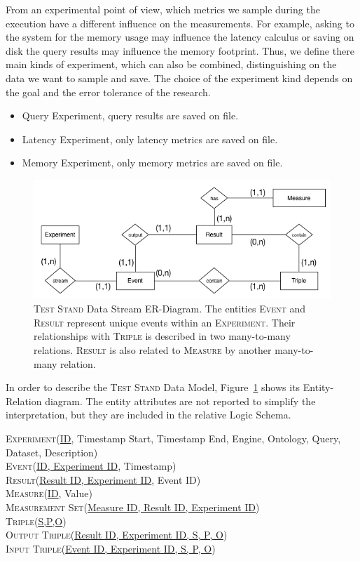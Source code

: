 From an experimental point of view, which metrics we sample during the execution have a different influence on the measurements. For example, asking to the system for the memory usage may influence the latency calculus or saving on disk the query results may influence the memory footprint. Thus, we define there main kinds of experiment, which can also be combined, distinguishing on the data we want to sample and save. The choice of the experiment kind depends on the goal and the error tolerance of the research.
\begin{itemize}
\item Query Experiment, query results are saved on file.
\item Latency Experiment, only latency metrics are saved on file.
\item Memory Experiment, only memory metrics are saved on file.
\end{itemize}

\begin{figure}[h!]
  \centering
	\includegraphics[width=\linewidth]{images/er-db}
	\caption[\textsc{Test Stand} Data Stream ER-Diagram]{\textsc{Test Stand} Data Stream ER-Diagram. The entities \textsc{Event} and \textsc{Result} represent unique events within an \textsc{Experiment}. Their relationships with \textsc{Triple} is described in two many-to-many relations. \textsc{Result} is also related to \textsc{Measure} by another many-to-many relation.}
  	\label{fig:er}
\end{figure}

\noindent In order to describe the \textsc{Test Stand} Data Model, Figure~\ref{fig:er} shows its Entity-Relation diagram. The entity attributes are not reported to simplify the interpretation, but they are included in the relative Logic Schema.

\noindent\textsc{Experiment}(\underline{ID}, Timestamp Start, Timestamp End, Engine, Ontology, Query, Dataset, Description)\\
\textsc{Event}(\underline{ID, Experiment ID}, Timestamp)\\
\textsc{Result}(\underline{Result ID, Experiment ID}, Event ID)\\
\textsc{Measure}(\underline{ID}, Value)\\
\textsc{Measurement Set}(\underline{Measure ID, Result ID, Experiment ID})\\
\textsc{Triple}(\underline{S,P,O})\\
\textsc{Output Triple}(\underline{Result ID, Experiment ID, S, P, O})\\
\textsc{Input Triple}(\underline{Event ID, Experiment ID, S, P, O})\\

